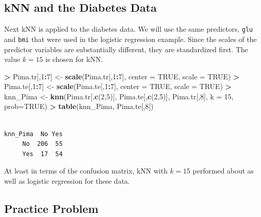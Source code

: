 \documentclass[
]{krantz}
\makeatletter
\newenvironment{Shaded}{\begin{snugshade}}{\end{snugshade}}
\newcommand{\DataTypeTok}[1]{\textcolor[rgb]{0.27,0.27,0.27}{#1}}
\newcommand{\DecValTok}[1]{\textcolor[rgb]{0.06,0.06,0.06}{#1}}
\newcommand{\KeywordTok}[1]{\textcolor[rgb]{0.27,0.27,0.27}{\textbf{#1}}}
\newcommand{\NormalTok}[1]{#1}
\newcommand{\OperatorTok}[1]{\textcolor[rgb]{0.43,0.43,0.43}{\textbf{#1}}}
\newcommand{\OtherTok}[1]{\textcolor[rgb]{0.37,0.37,0.37}{#1}}
\newcommand{\StringTok}[1]{\textcolor[rgb]{0.5,0.5,0.5}{#1}}
\newenvironment{kframe}{%
\medskip{}
\setlength{\fboxsep}{.8em}
 \def\at@end@of@kframe{}%
 \ifinner\ifhmode%
  \def\at@end@of@kframe{\end{minipage}}%
  \begin{minipage}{\columnwidth}%
 \fi\fi%
 \def\FrameCommand##1{\hskip\@totalleftmargin \hskip-\fboxsep
 \colorbox{shadecolor}{##1}\hskip-\fboxsep
     \hskip-\linewidth \hskip-\@totalleftmargin \hskip\columnwidth}%
 \MakeFramed {\advance\hsize-\width
   \@totalleftmargin\z@ \linewidth\hsize
   \@setminipage}}%
 {\par\unskip\endMakeFramed%
 \at@end@of@kframe}
\renewenvironment{Shaded}{\begin{kframe}}{\end{kframe}}
\makeatother
\begin{document}
\hypertarget{knn-and-the-diabetes-data}{%
\subsection{kNN and the Diabetes Data}\label{knn-and-the-diabetes-data}}

Next kNN is applied to the diabetes data. We will use the same predictors, \texttt{glu} and \texttt{bmi} that were used in the logistic regression example. Since the scales of the predictor variables are substantially different, they are standardized first. The value \(k=15\) is chosen for kNN.

\begin{Shaded}
\begin{Highlighting}[]
\OperatorTok{\textgreater{}}\StringTok{ }\NormalTok{Pima.tr[,}\DecValTok{1}\OperatorTok{:}\DecValTok{7}\NormalTok{] \textless{}{-}}\StringTok{ }\KeywordTok{scale}\NormalTok{(Pima.tr[,}\DecValTok{1}\OperatorTok{:}\DecValTok{7}\NormalTok{], }\DataTypeTok{center =} \OtherTok{TRUE}\NormalTok{, }\DataTypeTok{scale =} \OtherTok{TRUE}\NormalTok{)}
\OperatorTok{\textgreater{}}\StringTok{ }\NormalTok{Pima.te[,}\DecValTok{1}\OperatorTok{:}\DecValTok{7}\NormalTok{] \textless{}{-}}\StringTok{ }\KeywordTok{scale}\NormalTok{(Pima.te[,}\DecValTok{1}\OperatorTok{:}\DecValTok{7}\NormalTok{], }\DataTypeTok{center =} \OtherTok{TRUE}\NormalTok{, }\DataTypeTok{scale =} \OtherTok{TRUE}\NormalTok{)}
\OperatorTok{\textgreater{}}\StringTok{ }\NormalTok{knn\_Pima \textless{}{-}}\StringTok{ }\KeywordTok{knn}\NormalTok{(Pima.tr[,}\KeywordTok{c}\NormalTok{(}\DecValTok{2}\NormalTok{,}\DecValTok{5}\NormalTok{)], Pima.te[,}\KeywordTok{c}\NormalTok{(}\DecValTok{2}\NormalTok{,}\DecValTok{5}\NormalTok{)], Pima.tr[,}\DecValTok{8}\NormalTok{], }\DataTypeTok{k =} \DecValTok{15}\NormalTok{, }\DataTypeTok{prob=}\OtherTok{TRUE}\NormalTok{)}
\OperatorTok{\textgreater{}}\StringTok{ }\KeywordTok{table}\NormalTok{(knn\_Pima, Pima.te[,}\DecValTok{8}\NormalTok{])}
\end{Highlighting}
\end{Shaded}

\begin{verbatim}
        
knn_Pima  No Yes
     No  206  55
     Yes  17  54
\end{verbatim}

At least in terms of the confusion matrix, kNN with \(k=15\) performed about as well as logistic regression for these data.

\hypertarget{practice-problem-13}{%
\subsection{Practice Problem}\label{practice-problem-13}}
\end{document}
